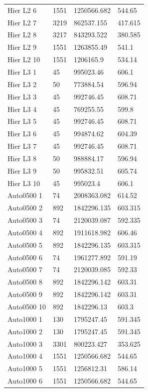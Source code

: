 \documentclass{svmult}
\begin{document}
\begin{small}
\begin{longtable}{p{2.3cm}p{1.5cm}p{2cm}p{1.3cm}}
    Hier L2 6 & 1551 & 1250566.682 & 544.65 \\
    Hier L2 7 & 3219 & 862537.155 & 417.615 \\
    Hier L2 8 & 3217 & 843293.522 & 380.585 \\
    Hier L2 9 & 1551 & 1263855.49 & 541.1 \\
    Hier L2 10 & 1551 & 1206165.9 & 534.14 \\
    \hline
    Hier L3 1 & 45 & 995023.46 & 606.1 \\
    Hier L3 2 & 50 & 773884.54 & 596.94 \\
    Hier L3 3 & 45 & 992746.45 & 608.71 \\
    Hier L3 4 & 45 & 769255.55 & 599.8 \\
    Hier L3 5 & 45 & 992746.45 & 608.71 \\
    Hier L3 6 & 45 & 994874.62 & 604.39 \\
    Hier L3 7 & 45 & 992746.45 & 608.71 \\
    Hier L3 8 & 50 & 988884.17 & 596.94 \\
    Hier L3 9 & 50 & 995832.51 & 605.74 \\
    Hier L3 10 & 45 & 995023.4 & 606.1 \\
    \hline
    Auto0500 1 & 74 & 2008363.082 & 614.52 \\
    Auto0500 2 & 892 & 1842296.135 & 603.315 \\
    Auto0500 3 & 74 & 2120039.087 & 592.335 \\
    Auto0500 4 & 892 & 1911618.982 & 606.46 \\
    Auto0500 5 & 892 & 1842296.135 & 603.315 \\
    Auto0500 6 & 74 & 1961277.892 & 591.19 \\
    Auto0500 7 & 74 & 2120039.085 & 592.33 \\
    Auto0500 8 & 892 & 1842296.142 & 603.31 \\
    Auto0500 9 & 892 & 1842296.142 & 603.31 \\
    Auto0500 10 & 892 & 1842296.13 & 603.3 \\
    \hline
    Auto1000 1 & 130 & 1795247.45 & 591.345 \\
    Auto1000 2 & 130 & 1795247.45 & 591.345 \\
    Auto1000 3 & 3301 & 800223.427 & 353.625 \\
    Auto1000 4 & 1551 & 1250566.682 & 544.65 \\
    Auto1000 5 & 1551 & 1256812.31 & 586.14 \\
    Auto1000 6 & 1551 & 1250566.682 & 544.65 \\

\end{longtable}
\end{small}
\end{document}
